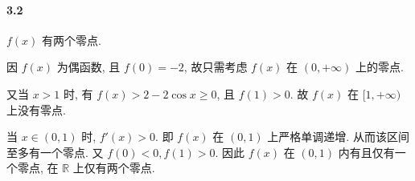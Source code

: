 \paragraph*{3.2} $f(x)$ 有两个零点.

因 $f(x)$ 为偶函数, 且 $f(0)=-2$, 故只需考虑 $f(x)$ 在 $(0, +\infty)$ 上的零点.

又当 $x > 1$ 时, 有 $f(x) > 2 - 2\cos x \geq 0$, 且 $f(1) > 0$. 故 $f(x)$ 在 $[1, +\infty)$ 上没有零点.

当 $x\in (0, 1)$ 时, $f'(x) > 0$. 即 $f(x)$ 在 $(0, 1)$ 上严格单调递增. 从而该区间至多有一个零点. 又 $f(0) < 0, f(1) > 0$. 因此 $f(x)$ 在 $(0, 1)$ 内有且仅有一个零点, 在 $\mathbb{R}$ 上仅有两个零点.